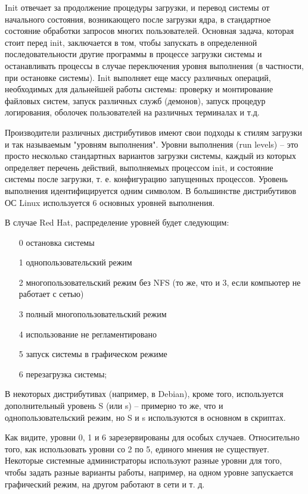 Init отвечает за продолжение процедуры загрузки, и перевод системы от начального состояния, возникающего после загрузки ядра, в стандартное состояние обработки запросов многих пользователей. Основная задача, которая стоит перед init, заключается в том, чтобы запускать в определенной последовательности другие программы в процессе загрузки системы и останавливать процессы в случае переключения уровня выполнения (в частности, при остановке системы). Init выполняет еще массу различных операций, необходимых для дальнейшей работы системы: проверку и монтирование файловых систем, запуск различных служб (демонов), запуск процедур логирования, оболочек пользователей на различных терминалах и т.д. 

Производители различных дистрибутивов имеют свои подходы к стилям загрузки и так называемым "уровням выполнения". Уровни выполнения (run levels) -- это просто несколько стандартных вариантов загрузки системы, каждый из которых определяет перечень действий, выполняемых процессом init, и состояние системы после загрузки, т. е. конфигурацию запущенных процессов. Уровень выполнения идентифицируется одним символом. В большинстве дистрибутивов ОС Linux используется 6 основных уровней выполнения.

В случае Red Hat, распределение уровней будет следующим:
\begin{enumerate}
\item[0] остановка системы
\item[1] однопользовательский режим
\item[2] многопользовательский режим без NFS (то же, что и 3, если компьютер не работает с сетью)
\item[3] полный многопользовательский режим
\item[4] использование не регламентировано
\item[5] запуск системы в графическом режиме
\item[6] перезагрузка системы;
\end{enumerate}

В некоторых дистрибутивах (например, в Debian), кроме того, используется дополнительный уровень S (или s)  -- примерно то же, что и однопользовательский режим, но S и s используются в основном в скриптах.

Как видите, уровни 0, 1 и 6 зарезервированы для особых случаев. Относительно того, как использовать уровни со 2 по 5, единого мнения не существует. Некоторые системные администраторы используют разные уровни для того, чтобы задать разные варианты работы, например, на одном уровне запускается графический режим, на другом работают в сети и т. д. 

